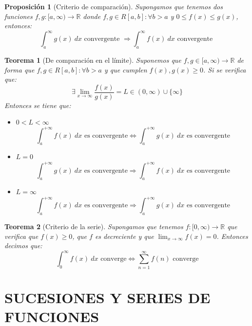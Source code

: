 \documentclass[10pt,a4paper,openright]{book}
\newtheorem{teorema}{Teorema}[chapter]
\newtheorem{proposicion}{Proposición}[chapter]
\begin{document}
\begin{proposicion}[Criterio de comparación]
Supongamos que tenemos dos funciones $f,g: [a, \infty)\rightarrow \mathbb R$ donde $f,g\in R[a,b]: \forall b> a$ y $0\leq f(x)\leq g(x)$, entonces:
$$\int_{a}^{\infty} g(x) \ dx \mbox{ convergente }\Rightarrow \int_{a}^{\infty} f(x) \ dx \mbox{ convergente } $$
\end{proposicion}

\begin{teorema}[De comparación en el límite]
Suponemos que $f,g\in [a,\infty)\rightarrow \mathbb R$ de forma que $f,g\in R[a,b]:\forall b > a$ y que cumplen $f(x),g(x)\geq 0$. Si se verifica que:
$$\exists \lim_{x \rightarrow \infty} \frac{f(x)}{g(x)} = L \in (0, \infty)\cup \{\infty\}$$
Entonces se tiene que:
\begin{itemize}
\item $0< L < \infty$
$$\int_{a}^{+\infty} f(x) \ dx \mbox{ es convergente}\Leftrightarrow \int_{a}^{+\infty} g(x) \ dx \mbox{ es convergente}$$

\item $L=0$
$$\int_{a}^{+\infty} g(x)\ dx\mbox{ es convergente}\Rightarrow \int_{a}^{+\infty} f(x)\ dx\mbox{ es convergente}$$

\item $L=\infty$
$$\int_{a}^{+\infty} f(x)\ dx\mbox{ es convergente}\Rightarrow \int_{a}^{+\infty} g(x)\ dx\mbox{ es convergente}$$
\end{itemize}
\end{teorema}

\begin{teorema}[Criterio de la serie]
Supongamos que tenemos $f:[0, \infty)\rightarrow \mathbb R$ que verifica que $f(x)\geq 0 $, que $f$ es decreciente y que $\lim_{x \rightarrow \infty} f(x) = 0$. Entonces decimos que:
$$\int_{0}^{\infty} f(x)\ dx \mbox{ converge} \Leftrightarrow \sum_{n = 1 }^{\infty} f(n)\mbox{ converge}$$
\end{teorema}

\chapter{SUCESIONES Y SERIES DE \\ FUNCIONES}
\end{document}

